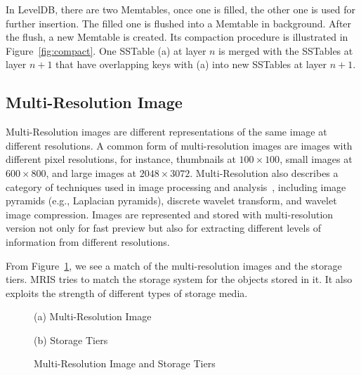 In LevelDB, there are two Memtables, once one is filled, the other one
is used for further insertion. The filled one is flushed into a
Memtable in background. After the flush, a new Memtable is created.
Its compaction procedure is illustrated in Figure~\ref{fig:compact}.
One SSTable (a) at layer $n$ is merged with the SSTables at layer
$n+1$ that have overlapping keys with (a) into new SSTables at layer
$n+1$.


\subsection{Multi-Resolution Image}

Multi-Resolution images are different representations of the same
image at different resolutions. A common form of multi-resolution
images are images with different pixel resolutions, for instance,
thumbnails at $100\times100$, small images at $600\times800$, and
large images at $2048\times3072$. Multi-Resolution also describes a
category of techniques used in image processing and
analysis~\cite{mrisimg}, including image pyramids (e.g., Laplacian
pyramids), discrete wavelet transform, and wavelet image compression.
Images are represented and stored with multi-resolution version not
only for fast preview but also for extracting different levels of
information from different resolutions.

From Figure~\ref{fig:mrisidea}, we see a match of the multi-resolution
images and the storage tiers. MRIS tries to match the storage system
for the objects stored in it. It also exploits the strength of
different types of storage media.

\begin{figure}[t]
  \centering
  \begin{minipage}[l]{0.48\linewidth}
    \centerline{\footnotesize(a) Multi-Resolution Image}\medskip
  \end{minipage}
  \begin{minipage}[r]{0.48\linewidth}
    \centerline{\footnotesize(b) Storage Tiers}\medskip
  \end{minipage}
  \caption{Multi-Resolution Image and Storage Tiers}
  \label{fig:mrisidea}
\end{figure}




